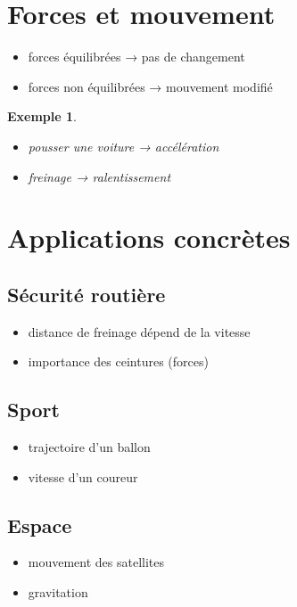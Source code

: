 \documentclass[11pt,a4paper]{article}
\newtheorem{example}{Exemple}
\begin{document}
\section{Forces et mouvement}

\begin{itemize}
\item forces équilibrées → pas de changement
\item forces non équilibrées → mouvement modifié
\end{itemize}

\begin{example}
\begin{itemize}
\item pousser une voiture → accélération
\item freinage → ralentissement
\end{itemize}
\end{example}

\section{Applications concrètes}

\subsection{Sécurité routière}

\begin{itemize}
\item distance de freinage dépend de la vitesse
\item importance des ceintures (forces)
\end{itemize}

\subsection{Sport}

\begin{itemize}
\item trajectoire d’un ballon
\item vitesse d’un coureur
\end{itemize}

\subsection{Espace}

\begin{itemize}
\item mouvement des satellites
\item gravitation
\end{itemize}
\end{document}
